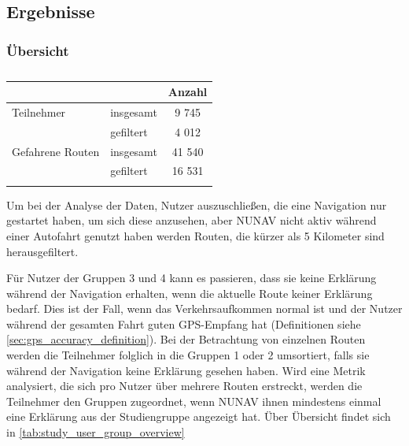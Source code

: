 \subsection{Ergebnisse}
\label{sec:study_results_quantitativ}

\subsubsection{Übersicht}

\begin{longtable}{|l|l|c|}
    \hline
                        &           & \textbf{Anzahl} \\ \hline
    Teilnehmer          & insgesamt & 9 745 \\
                        & gefiltert & 4 012 \\ \hline
    Gefahrene Routen    & insgesamt & 41 540 \\
                        & gefiltert & 16 531 \\ \hline
\caption{}
\label{tab:study_user_overview}
\end{longtable}

Um bei der Analyse der Daten, Nutzer auszuschließen, die eine Navigation nur gestartet haben, um sich diese anzusehen, aber NUNAV nicht aktiv während einer Autofahrt genutzt haben werden Routen, die kürzer als 5 Kilometer sind herausgefiltert. 

Für Nutzer der Gruppen 3 und 4 kann es passieren, dass sie keine Erklärung während der Navigation erhalten, wenn die aktuelle Route keiner Erklärung bedarf. Dies ist der Fall, wenn das Verkehrsaufkommen \glqq normal\grqq{} ist und der Nutzer während der gesamten Fahrt guten GPS-Empfang hat (Definitionen siehe \autoref{sec:gps_accuracy_definition}). Bei der Betrachtung von einzelnen Routen werden die Teilnehmer folglich in die Gruppen 1 oder 2 umsortiert, falls sie während der Navigation keine Erklärung gesehen haben. Wird eine Metrik analysiert, die sich pro Nutzer über mehrere Routen erstreckt, werden die Teilnehmer den Gruppen zugeordnet, wenn NUNAV ihnen mindestens einmal eine Erklärung aus der Studiengruppe angezeigt hat. Über Übersicht findet sich in \autoref{tab:study_user_group_overview}

